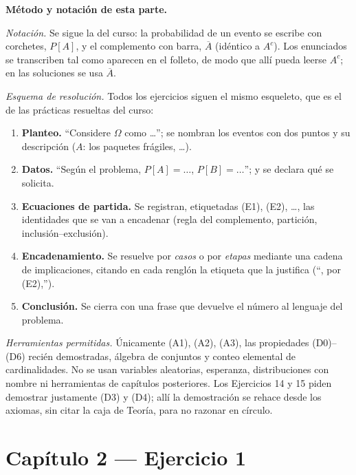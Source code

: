 \documentclass[11pt]{article}
\begin{document}
\begin{nota}
\textbf{Método y notación de esta parte.}

\emph{Notación.} Se sigue la del curso: la probabilidad de un evento se escribe con corchetes,
$P[A]$, y el complemento con barra, $\overline{A}$ (idéntico a $A^{c}$). Los enunciados se
transcriben tal como aparecen en el folleto, de modo que allí pueda leerse $A^{c}$; en las
soluciones se usa $\overline{A}$.

\emph{Esquema de resolución.} Todos los ejercicios siguen el mismo esqueleto, que es el de las
prácticas resueltas del curso:
\begin{enumerate}[leftmargin=*]
  \item \textbf{Planteo.} ``Considere $\Omega$ como \dots''; se nombran los eventos con dos
  puntos y su descripción ($A$: los paquetes frágiles, \dots).
  \item \textbf{Datos.} ``Según el problema, $P[A]=\dots$, $P[B]=\dots$''; y se declara qué se
  solicita.
  \item \textbf{Ecuaciones de partida.} Se registran, etiquetadas (E1), (E2), \dots, las
  identidades que se van a encadenar (regla del complemento, partición, inclusión--exclusión).
  \item \textbf{Encadenamiento.} Se resuelve por \emph{casos} o por \emph{etapas} mediante una
  cadena de implicaciones, citando en cada renglón la etiqueta que la justifica (``, por (E2),'').
  \item \textbf{Conclusión.} Se cierra con una frase que devuelve el número al lenguaje del
  problema.
\end{enumerate}

\emph{Herramientas permitidas.} Únicamente (A1), (A2), (A3), las propiedades (D0)--(D6) recién
demostradas, álgebra de conjuntos y conteo elemental de cardinalidades. No se usan variables
aleatorias, esperanza, distribuciones con nombre ni herramientas de capítulos posteriores. Los
Ejercicios 14 y 15 piden demostrar justamente (D3) y (D4); allí la demostración se rehace desde
los axiomas, sin citar la caja de Teoría, para no razonar en círculo.
\end{nota}

\section*{Capítulo 2 --- Ejercicio 1}
\end{document}

